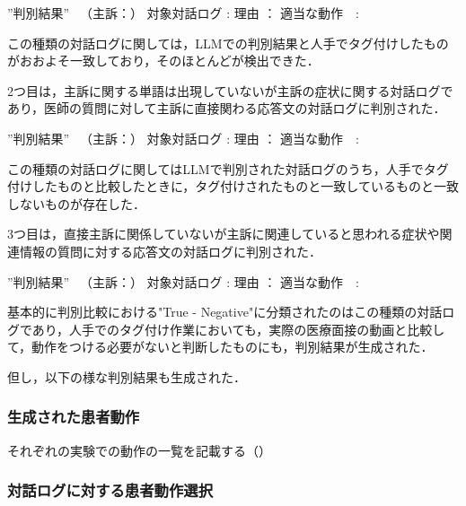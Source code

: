 ”判別結果” 　（主訴：）
  対象対話ログ  :
         理由  ：
    適当な動作　:

この種類の対話ログに関しては，LLMでの判別結果と人手でタグ付けしたものがおおよそ一致しており，そのほとんどが検出できた．

2つ目は，主訴に関する単語は出現していないが主訴の症状に関する対話ログであり，医師の質問に対して主訴に直接関わる応答文の対話ログに判別された．

”判別結果” 　（主訴：）
  対象対話ログ  :
         理由  ：
    適当な動作　:

この種類の対話ログに関してはLLMで判別された対話ログのうち，人手でタグ付けしたものと比較したときに，タグ付けされたものと一致しているものと一致しないものが存在した．

3つ目は，直接主訴に関係していないが主訴に関連していると思われる症状や関連情報の質問に対する応答文の対話ログに判別された．

”判別結果” 　（主訴：）
  対象対話ログ  :
         理由  ：
    適当な動作　:

基本的に判別比較における"True - Negative"に分類されたのはこの種類の対話ログであり，人手でのタグ付け作業においても，実際の医療面接の動画と比較して，動作をつける必要がないと判断したものにも，判別結果が生成された．

但し，以下の様な判別結果も生成された．

\subsubsection*{生成された患者動作}
それぞれの実験での動作の一覧を記載する（）


\subsubsection*{対話ログに対する患者動作選択}
